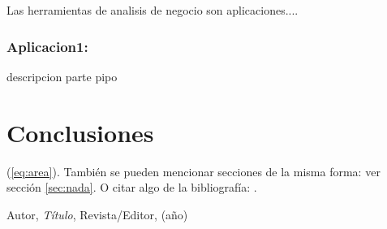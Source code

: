 Las herramientas de analisis de negocio son aplicaciones....

\subsubsection{Aplicacion1: }\label{sec:nada2}  
descripcion parte pipo


\section{Conclusiones}

(\ref{eq:area}).
También se pueden mencionar secciones de la misma forma: ver sección
\ref{sec:nada}. O citar algo de la bibliografía: \cite{Cd94}.


\begin{thebibliography}{99}

 Autor, \emph{Título}, Revista/Editor, (año)

\end{thebibliography}


